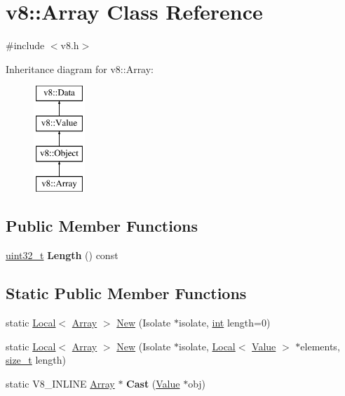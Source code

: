 \hypertarget{classv8_1_1Array}{}\section{v8\+:\+:Array Class Reference}
\label{classv8_1_1Array}


{\ttfamily \#include $<$v8.\+h$>$}

Inheritance diagram for v8\+:\+:Array\+:\begin{figure}[H]
\begin{center}
\leavevmode
\includegraphics[height=4.000000cm]{classv8_1_1Array}
\end{center}
\end{figure}
\subsection*{Public Member Functions}
\begin{DoxyCompactItemize}
\item 
\mbox{\label{classv8_1_1Array_ad6b33c7dd543044ca2311c000a1642dd}} 
\mbox{\hyperlink{classuint32__t}{uint32\+\_\+t}} {\bfseries Length} () const
\end{DoxyCompactItemize}
\subsection*{Static Public Member Functions}
\begin{DoxyCompactItemize}
\item 
static \mbox{\hyperlink{classv8_1_1Local}{Local}}$<$ \mbox{\hyperlink{classv8_1_1Array}{Array}} $>$ \mbox{\hyperlink{classv8_1_1Array_a369cbd533bf7aa08d9ce1e2ddb4e6536}{New}} (Isolate $\ast$isolate, \mbox{\hyperlink{classint}{int}} length=0)
\item 
static \mbox{\hyperlink{classv8_1_1Local}{Local}}$<$ \mbox{\hyperlink{classv8_1_1Array}{Array}} $>$ \mbox{\hyperlink{classv8_1_1Array_aab9ef356c6af82a86d44099c0aeca232}{New}} (Isolate $\ast$isolate, \mbox{\hyperlink{classv8_1_1Local}{Local}}$<$ \mbox{\hyperlink{classv8_1_1Value}{Value}} $>$ $\ast$elements, \mbox{\hyperlink{classsize__t}{size\+\_\+t}} length)
\item 
\mbox{\label{classv8_1_1Array_ae56792766f8513395c3ebe8c29afde4b}} 
static V8\+\_\+\+I\+N\+L\+I\+NE \mbox{\hyperlink{classv8_1_1Array}{Array}} $\ast$ {\bfseries Cast} (\mbox{\hyperlink{classv8_1_1Value}{Value}} $\ast$obj)
\end{DoxyCompactItemize}


